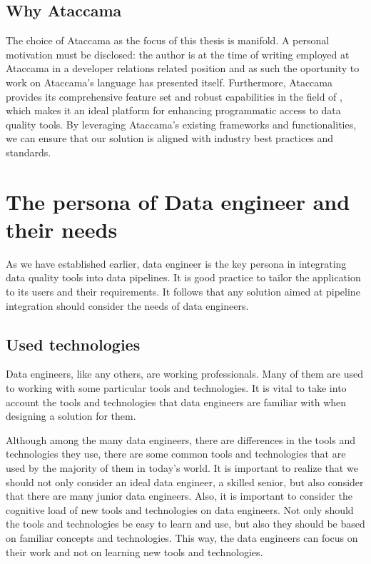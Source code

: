 \subsection{Why Ataccama}

The choice of Ataccama as the focus of this thesis is manifold. A personal motivation must be disclosed: the author is at the time of writing employed at Ataccama in a developer relations related position and as such the oportunity to work on Ataccama's language has presented itself. Furthermore, Ataccama provides its comprehensive feature set and robust capabilities in the field of , which makes it an ideal platform for enhancing programmatic access to data quality tools. By leveraging Ataccama's existing frameworks and functionalities, we can ensure that our solution is aligned with industry best practices and standards.

\section{The persona of Data engineer and their needs}

As we have established earlier, data engineer is the key persona in integrating data quality tools into data pipelines. It is good practice to tailor the application to its users and their requirements. It follows that any solution aimed at pipeline integration should consider the needs of data engineers.

\subsection{Used technologies}

Data engineers, like any others, are working professionals. Many of them are used to working with some particular tools and technologies. It is vital to take into account the tools and technologies that data engineers are familiar with when designing a solution for them.

Although among the many data engineers, there are differences in the tools and technologies they use, there are some common tools and technologies that are used by the majority of them in today's world. It is important to realize that we should not only consider an ideal data engineer, a skilled senior, but also consider that there are many junior data engineers. Also, it is important to consider the cognitive load of new tools and technologies on data engineers. Not only should the tools and technologies be easy to learn and use, but also they should be based on familiar concepts and technologies. This way, the data engineers can focus on their work and not on learning new tools and technologies. 

